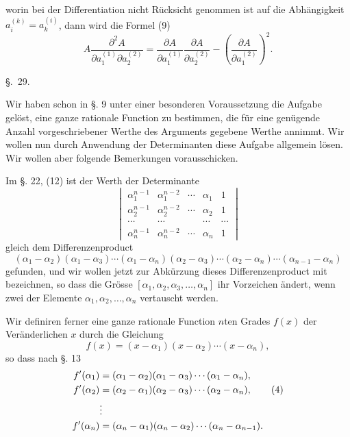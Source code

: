 
worin bei der Differentiation nicht Rücksicht genommen ist auf die Abhängigkeit $a_i^{(k)}=a_k^{(i)}$, dann wird die Formel (9)
\begin{equation}
 A\frac{\partial^2A}{\partial a_1^{(1)}\partial a_2^{(2)}}
 =\frac{\partial A}{\partial a_1^{(1)}}\frac{\partial A}{\partial a_2^{(2)}}
 -\left(\frac{\partial A}{\partial a_1^{(2)}}\right)^2.\tag{10}
\end{equation}

\begin{center}
{\large \S.\ 29.}

\vspace{0.5em}
{\large{}}
\end{center}

Wir haben schon in §. 9 unter einer besonderen Voraussetzung die Aufgabe gelöst, eine ganze rationale Function zu bestimmen, die für eine genügende Anzahl vorgeschriebener Werthe des Arguments gegebene Werthe annimmt. Wir wollen nun durch Anwendung der Determinanten diese Aufgabe allgemein lösen. Wir wollen aber folgende Bemerkungen vorausschicken.

Im §. 22, (12) ist der Werth der Determinante
\[
\begin{vmatrix}
 \alpha_1^{n-1}&\alpha_1^{n-2}&\cdots&\alpha_1&1\\
 \alpha_2^{n-1}&\alpha_2^{n-2}&\cdots&\alpha_2&1\\
 \cdots&\cdots&&\cdots&\cdots\\
 \alpha_n^{n-1}&\alpha_n^{n-2}&\cdots&\alpha_n&1
\end{vmatrix}
\]
gleich dem Differenzenproduct
\begin{equation}
(\alpha_1-\alpha_2)(\alpha_1-\alpha_3)\cdots(\alpha_1-\alpha_n)
(\alpha_2-\alpha_3)\cdots(\alpha_2-\alpha_n)\cdots(\alpha_{n-1}-\alpha_n)\tag{1}
\end{equation}
gefunden, und wir wollen jetzt zur Abkürzung dieses Differenzenproduct mit
\begin{equation}
 [\alpha_1,\alpha_2,\alpha_3,\ldots,\alpha_n]\tag{2}
\end{equation}
bezeichnen, so dass die Grösse $[\alpha_1,\alpha_2,\alpha_3,\ldots,\alpha_n]$ ihr Vorzeichen ändert, wenn zwei der Elemente $\alpha_1,\alpha_2,\ldots,\alpha_n$ vertauscht werden.

Wir definiren ferner eine ganze rationale Function $n$ten Grades $f(x)$ der Veränderlichen $x$ durch die Gleichung
\begin{equation}
 f(x)=(x-\alpha_1)(x-\alpha_2)\cdots(x-\alpha_n),\tag{3}
\end{equation}
so dass nach §. 13
\begin{align}
 f'(\alpha_1)&=(\alpha_1-\alpha_2)(\alpha_1-\alpha_3)\cdots(\alpha_1-\alpha_n),\notag\\
 f'(\alpha_2)&=(\alpha_2-\alpha_1)(\alpha_2-\alpha_3)\cdots(\alpha_2-\alpha_n),\tag{4}\\
 &\vdots\notag\\
 f'(\alpha_n)&=(\alpha_n-\alpha_1)(\alpha_n-\alpha_2)\cdots(\alpha_n-\alpha_{n-1}).\notag
\end{align}
